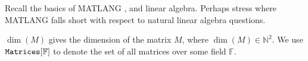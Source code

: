 Recall the basics of MATLANG \cite{matlang}, and linear algebra. Perhaps stress where MATLANG falls short with respect to natural linear algebra questions.

\bigskip

$\dim(M)$ gives the dimension of the matrix $M$, where $\dim(M)\in \mathbb{N}^2$. We use $\texttt{Matrices}[\mathbb{F}]$ to denote the set of all matrices over some field $\mathbb{F}$.

\bigskip

%
%
%

